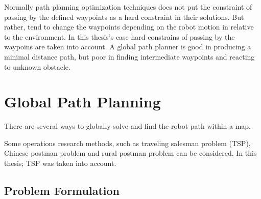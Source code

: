 

Normally path planning optimization techniques does not put the constraint of passing by the defined waypoints as a hard constraint in their solutions. But rather, tend to change the waypoints depending on the robot motion in relative to the environment. In this thesis's case hard constrains of passing by the waypoins are taken into account. A global path planner is good in producing a minimal distance path, but poor in finding intermediate waypoints and reacting to unknown obstacle.


\section{Global Path Planning } \label{global_path_planning}
There are several ways to globally solve and find the robot path within a map. %


Some operations research methods, such as traveling salesman problem (TSP), Chinese postman problem and rural postman problem can be considered. In this thesis; TSP was taken into account. 


\subsection{Problem Formulation}





